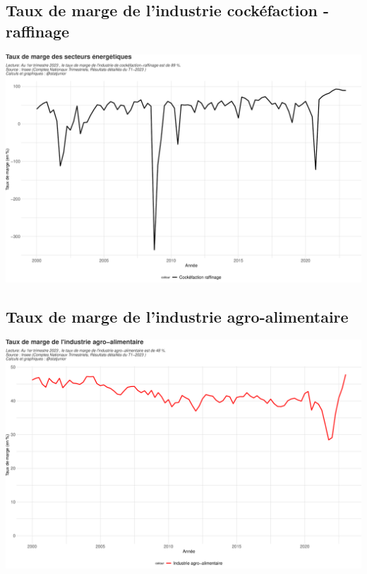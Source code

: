 \documentclass[
  paper=a4,
  ,captions=tableheading
]{scrartcl}
\begin{document}
\hypertarget{taux-de-marge-de-lindustrie-cockuxe9faction---raffinage}{%
\subsection{Taux de marge de l'industrie cockéfaction -
raffinage}\label{taux-de-marge-de-lindustrie-cockuxe9faction---raffinage}}

\includegraphics{rapport_pdf_compte_branche_files/figure-latex/unnamed-chunk-32-1.pdf}

\hypertarget{taux-de-marge-de-lindustrie-agro-alimentaire}{%
\subsection{Taux de marge de l'industrie
agro-alimentaire}\label{taux-de-marge-de-lindustrie-agro-alimentaire}}

\includegraphics{rapport_pdf_compte_branche_files/figure-latex/unnamed-chunk-33-1.pdf}
\end{document}
